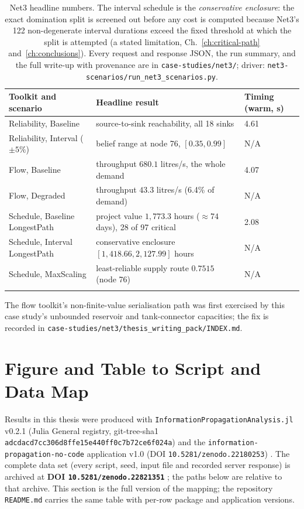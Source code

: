 \documentclass[12pt]{report}
\providecommand{\filepath}[1]{\nolinkurl{#1}}
\begin{document}
{\footnotesize
\begin{longtable}{@{}p{4.0cm} p{6.2cm} l@{}}
\toprule
Toolkit and scenario & Headline result & Timing (warm, s) \\
\midrule
\endhead
Reliability, Baseline           & source-to-sink reachability, all 18 sinks & 4.61 \\
Reliability, Interval ($\pm5\%$) & belief range at node 76, $[0.35, 0.99]$ & N/A \\
Flow, Baseline                  & throughput $680.1$ litres/s, the whole demand & 4.07 \\
Flow, Degraded                  & throughput $43.3$ litres/s (6.4\% of demand) & N/A \\
Schedule, Baseline LongestPath  & project value $1{,}773.3$ hours ($\approx 74$ days), 28 of 97 critical & 2.08 \\
Schedule, Interval LongestPath  & conservative enclosure $[1{,}418.66, 2{,}127.99]$ hours & N/A \\
Schedule, MaxScaling            & least-reliable supply route $0.7515$ (node 76) & N/A \\
\bottomrule
\caption{Net3 headline numbers. The interval schedule is the \emph{conservative
enclosure}: the exact domination split is screened out before any cost is computed because
Net3's 122 non-degenerate interval durations exceed the fixed threshold at which the split
is attempted (a stated limitation, Ch.~\ref{ch:critical-path} and~\ref{ch:conclusions}).
Every request and response JSON, the run summary, and the full write-up with provenance
are in \filepath{case-studies/net3/}; driver:
\filepath{net3-scenarios/run\_net3\_scenarios.py}.}
\label{tab:appB-net3}
\end{longtable}}

The flow toolkit's non-finite-value serialisation path was first exercised by this case
study's unbounded reservoir and tank-connector capacities; the fix is recorded in
\filepath{case-studies/net3/thesis\_writing\_pack/INDEX.md}.

\section{Figure and Table to Script and Data Map}
\label{sec:appB-map}

Results in this thesis were produced with \texttt{InformationPropagationAnalysis.jl}
v0.2.1 (Julia General registry, git-tree-sha1
\texttt{adcdacd7cc306d8ffe15e440ff0c7b72ce6f024a}) and the
\texttt{information-propagation-no-code} application v1.0
(DOI \texttt{10.5281/zenodo.22180253}) \cite{ipfnocode}. The complete data set (every
script, seed, input file and recorded server response) is archived at
\textbf{DOI \texttt{10.5281/zenodo.22821351}} \cite{thesisdata}; the paths below are
relative to that archive. This section is the full version of the mapping; the
repository \filepath{README.md} carries the same table with per-row package and
application versions.
\end{document}
